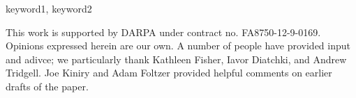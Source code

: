 \documentclass[preprint]{sigplanconf}
\begin{document}
\keywords
keyword1, keyword2



















\acks

This work is supported by DARPA under contract no. FA8750-12-9-0169.  Opinions
expressed herein are our own.  A number of people have provided input and
adivce; we particularly thank Kathleen Fisher, Iavor Diatchki, and Andrew
Tridgell.  Joe Kiniry and Adam Foltzer provided helpful comments on earlier
drafts of the paper.








\end{document}
